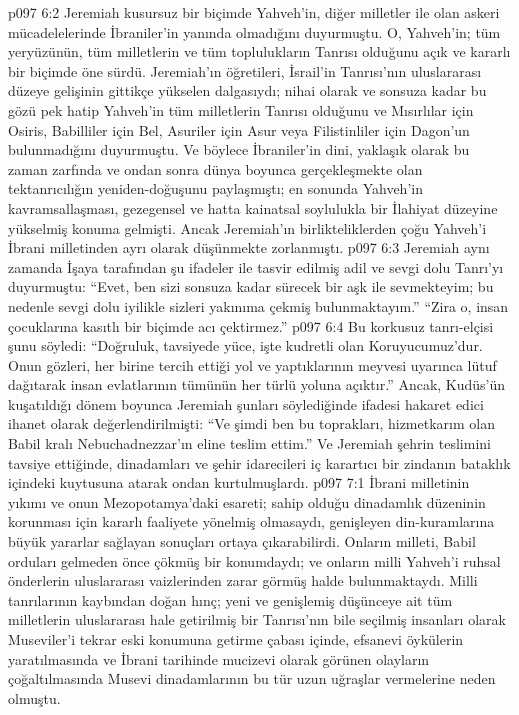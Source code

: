 \vs p097 6:2 Jeremiah kusursuz bir biçimde Yahveh’in, diğer milletler ile olan askeri mücadelelerinde İbraniler’in yanında olmadığını duyurmuştu. O, Yahveh’in; tüm yeryüzünün, tüm milletlerin ve tüm toplulukların Tanrısı olduğunu açık ve kararlı bir biçimde öne sürdü. Jeremiah’ın öğretileri, İsrail’in Tanrısı’nın uluslararası düzeye gelişinin gittikçe yükselen dalgasıydı; nihai olarak ve sonsuza kadar bu gözü pek hatip Yahveh’in tüm milletlerin Tanrısı olduğunu ve Mısırlılar için Osiris, Babilliler için Bel, Asuriler için Asur veya Filistinliler için Dagon’un bulunmadığını duyurmuştu. Ve böylece İbraniler’in dini, yaklaşık olarak bu zaman zarfında ve ondan sonra dünya boyunca gerçekleşmekte olan tektanrıcılığın yeniden\hyp{}doğuşunu paylaşmıştı; en sonunda Yahveh’in kavramsallaşması, gezegensel ve hatta kainatsal soylulukla bir İlahiyat düzeyine yükselmiş konuma gelmişti. Ancak Jeremiah’ın birlikteliklerden çoğu Yahveh’i İbrani milletinden ayrı olarak düşünmekte zorlanmıştı.
\vs p097 6:3 Jeremiah aynı zamanda İşaya tarafından şu ifadeler ile tasvir edilmiş adil ve sevgi dolu Tanrı’yı duyurmuştu: “Evet, ben sizi sonsuza kadar sürecek bir aşk ile sevmekteyim; bu nedenle sevgi dolu iyilikle sizleri yakınıma çekmiş bulunmaktayım.” “Zira o, insan çocuklarına kasıtlı bir biçimde acı çektirmez.”
\vs p097 6:4 Bu korkusuz tanrı\hyp{}elçisi şunu söyledi: “Doğruluk, tavsiyede yüce, işte kudretli olan Koruyucumuz’dur. Onun gözleri, her birine tercih ettiği yol ve yaptıklarının meyvesi uyarınca lütuf dağıtarak insan evlatlarının tümünün her türlü yoluna açıktır.” Ancak, Kudüs’ün kuşatıldığı dönem boyunca Jeremiah şunları söylediğinde ifadesi hakaret edici ihanet olarak değerlendirilmişti: “Ve şimdi ben bu toprakları, hizmetkarım olan Babil kralı Nebuchadnezzar’ın eline teslim ettim.” Ve Jeremiah şehrin teslimini tavsiye ettiğinde, dinadamları ve şehir idarecileri iç karartıcı bir zindanın bataklık içindeki kuytusuna atarak ondan kurtulmuşlardı.
\vs p097 7:1 İbrani milletinin yıkımı ve onun Mezopotamya’daki esareti; sahip olduğu dinadamlık düzeninin korunması için kararlı faaliyete yönelmiş olmasaydı, genişleyen din\hyp{}kuramlarına büyük yararlar sağlayan sonuçları ortaya çıkarabilirdi. Onların milleti, Babil orduları gelmeden önce çökmüş bir konumdaydı; ve onların milli Yahveh’i ruhsal önderlerin uluslararası vaizlerinden zarar görmüş halde bulunmaktaydı. Milli tanrılarının kaybından doğan hınç; yeni ve genişlemiş düşünceye ait tüm milletlerin uluslararası hale getirilmiş bir Tanrısı’nın bile seçilmiş insanları olarak Museviler’i tekrar eski konumuna getirme çabası içinde, efsanevi öykülerin yaratılmasında ve İbrani tarihinde mucizevi olarak görünen olayların çoğaltılmasında Musevi dinadamlarının bu tür uzun uğraşlar vermelerine neden olmuştu.
